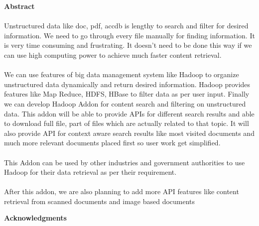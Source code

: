 \documentclass[oneside,a4paper,12pt]{report}
\begin{document}
\newpage
{}
\begin{center}
\renewcommand{\thepage}{\arabic{page}}
\textbf{Abstract} \\[8ex]

\end{center}

\paragraph{} 
Unstructured data like doc, pdf, accdb is lengthy to search and filter for desired information. We need to go through every file manually for finding information. It is very time consuming and frustrating. It doesn’t need to be done this way if we can use high computing power to achieve much faster content retrieval. 

\paragraph{} 
We can use features of big data management system like Hadoop to organize unstructured data dynamically and return desired information. Hadoop provides features like Map Reduce, HDFS, HBase to filter data as per user input. Finally we can develop Hadoop Addon for content search and filtering on unstructured data. This addon will be able to provide APIs for different search results and able to download full file, part of files which are actually related to that topic. It will also provide API for context aware search results like most visited documents and much more relevant documents placed first so user work get simplified.  

\paragraph{}
This Addon can be used by other industries and government authorities to use Hadoop for their data retrieval as per their requirement. 

\paragraph{}
After this addon, we are also planning to add more API features like content retrieval from scanned documents and image based documents


\newpage

\begin{center}

\textbf{Acknowledgments} \\[8ex]

\end{center}
\end{document}
